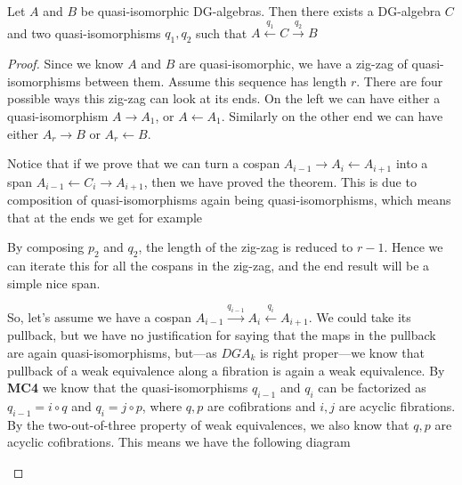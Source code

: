 \begin{theorem}
\label{thm:span}
Let $A$ and $B$ be quasi-isomorphic DG-algebras. Then there exists a DG-algebra $C$ and two quasi-isomorphisms $q_1, q_2$ such that $A\overset{q_1}\longleftarrow C \overset{q_2}\longrightarrow B$
\end{theorem}
\begin{proof}
Since we know $A$ and $B$ are quasi-isomorphic, we have a zig-zag of quasi-isomorphisms between them. Assume this sequence has length $r$. There are four possible ways this zig-zag can look at its ends. On the left we can have either a quasi-isomorphism $A\longrightarrow A_1$, or $A\longleftarrow A_1$. Similarly on the other end we can have either $A_r\longrightarrow B$ or $A_r\longleftarrow B$. 

Notice that if we prove that we can turn a cospan $A_{i-1}\longrightarrow A_i\longleftarrow A_{i+1}$ into a span $A_{i-1}\longleftarrow C_i \longrightarrow A_{i+1}$, then we have proved the theorem. This is due to composition of quasi-isomorphisms again being quasi-isomorphisms, which means that at the ends we get for example
\begin{center}
\end{center}
By composing $p_2$ and $q_2$, the length of the zig-zag is reduced to $r-1$. Hence we can iterate this for all the cospans in the zig-zag, and the end result will be a simple nice span. 

So, let's assume we have a cospan $A_{i-1}\overset{q_{i-1}}\longrightarrow A_i\overset{q_i}\longleftarrow A_{i+1}$. We could take its pullback, but we have no justification for saying that the maps in the pullback are again quasi-isomorphisms, but---as $DGA_k$ is right proper---we know that pullback of a weak equivalence along a fibration is again a weak equivalence. By \textbf{MC4} we know that the quasi-isomorphisms $q_{i-1}$ and $q_i$ can be factorized as $q_{i-1} = i \circ q$ and $q_i = j\circ p$, where $q, p$ are cofibrations and $i, j$ are acyclic fibrations. By the two-out-of-three property of weak equivalences, we also know that $q, p$ are acyclic cofibrations. This means we have the following diagram
\begin{center}
\end{center}
\end{proof}
